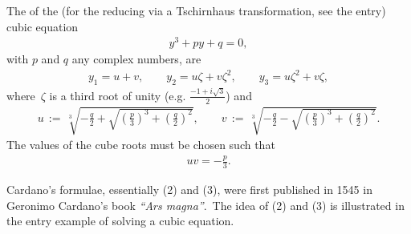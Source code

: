 \documentclass[12pt]{article}
\theoremstyle{definition}
\begin{document}
The  of the  
(for the reducing via a 
Tschirnhaus transformation, see the  entry) cubic equation
\begin{align}
y^3+py+q = 0,
\end{align}
with $p$ and $q$ any complex numbers, are
\begin{align}
y_1 = u+v, \qquad 
  y_2 = u\zeta+v\zeta^2, \qquad y_3 = u\zeta^2+v\zeta,
\end{align}
where\, $\zeta$ is a  third root of unity (e.g. $\frac{-1+i\sqrt{3}}{2}$) and
\begin{align}
u \,:=\, \sqrt[3]
{-\frac{q}{2}+\sqrt{\left(\frac{p}{3}\right)^3+\left(\frac{q}{2}\right)^2}},
 \qquad 
v \,:=\, \sqrt[3]{-\frac{q}{2}-\sqrt{\left(\frac{p}{3}\right)^3+\left(\frac{q}{2}\right)^2}}.
\end{align}
The values of the cube roots must be chosen such that
\begin{align}
uv = -\frac{p}{3}.
\end{align}

Cardano's formulae, essentially (2) and (3), were first published in 1545 in Geronimo Cardano's book {\em ``Ars magna''}.\, The idea of (2) and (3) is illustrated in the entry example of solving a cubic equation.\\
\end{document}
